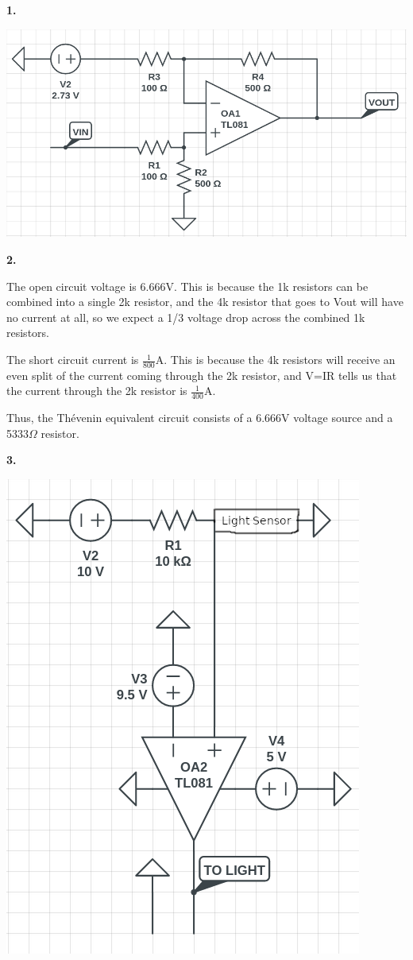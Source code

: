 \documentclass{article}
\begin{document}
\medskip\noindent\textbf{1.} 

    \begin{center} \includegraphics[scale=.7]{1.png} \end{center}

\medskip\noindent\textbf{2.} 

    The open circuit voltage is 6.666V.
    This is because the 1k resistors can be combined into a single 2k resistor, and the 4k resistor that goes to Vout will have no current at all, so we expect a 1/3 voltage drop across the combined 1k resistors.
    
    The short circuit current is $\frac1{800}$A.
    This is because the 4k resistors will receive an even split of the current coming through the 2k resistor, and V=IR tells us that the current through the 2k resistor is $\frac1{400}$A.

    Thus, the Thévenin equivalent circuit consists of a 6.666V voltage source and a 5333$\Omega$ resistor.

\newpage\noindent\textbf{3.}

    \begin{center} \includegraphics{2.png} \end{center}
\end{document}
